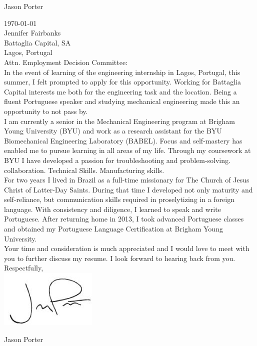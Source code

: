 \documentclass[A4]{article}
\begin{document}
\begin{center}
\Huge Jason Porter\\
\end{center}
\normalsize
\noindent
\today\\

\noindent
Jennifer Fairbanks\\
Battaglia Capital, SA\\
Lagos, Portugal\\

\noindent
Attn. Employment Decision Committee:\\

\noindent
In the event of learning of the engineering internship in Lagos, Portugal, this summer, I felt prompted to apply for this opportunity.  Working for Battaglia Capital interests me both for the engineering task and the location.  Being a fluent Portuguese speaker and studying mechanical engineering made this an opportunity to not pass by.   \\

I am currently a senior in the Mechanical Engineering program at Brigham Young University (BYU) and work as a research assistant for the BYU Biomechanical Engineering Laboratory (BABEL).  Focus and self-mastery has enabled me to pursue learning in all areas of my life.  Through my coursework at BYU I have developed a passion for troubleshooting and problem-solving.  collaboration.  Technical Skills.  Manufacturing skills.     \\

For two years I lived in Brazil as a full-time missionary for The Church of Jesus Christ of Latter-Day Saints.  During that time I developed not only maturity and self-reliance, but communication skills required in proselytizing in a foreign language.  With consistency and diligence, I learned to speak and write Portuguese.  After returning home in 2013, I took advanced Portuguese classes and obtained my Portuguese Language Certification at Brigham Young University.\\

Your time and consideration is much appreciated and I would love to meet with you to further discuss my resume.  I look forward to hearing back from you.\\

\noindent
Respectfully,\\
\noindent
\includegraphics[scale=.5]{signature}

\noindent
Jason Porter
\end{document}
